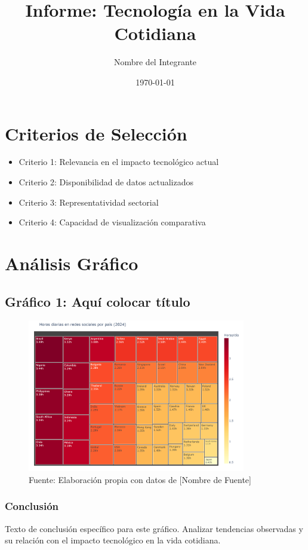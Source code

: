 \documentclass[12pt, a4paper]{article}
\title{Informe: Tecnología en la Vida Cotidiana}
\author{Nombre del Integrante}
\date{\today}
\begin{document}
\maketitle

\section*{Criterios de Selección}
\begin{itemize}
    \item Criterio 1: Relevancia en el impacto tecnológico actual
    \item Criterio 2: Disponibilidad de datos actualizados
    \item Criterio 3: Representatividad sectorial
    \item Criterio 4: Capacidad de visualización comparativa
\end{itemize}

\section*{Análisis Gráfico}

\subsection*{Gráfico 1: Aquí colocar título}
\begin{figure}[H]
    \centering
    \includegraphics[width=0.85\textwidth]{images/graph1_JG.png}
    \caption{Fuente: Elaboración propia con datos de [Nombre de Fuente]}
\end{figure}

\subsubsection*{Conclusión}
Texto de conclusión específico para este gráfico. Analizar tendencias observadas y su relación con el impacto tecnológico en la vida cotidiana.
\end{document}
